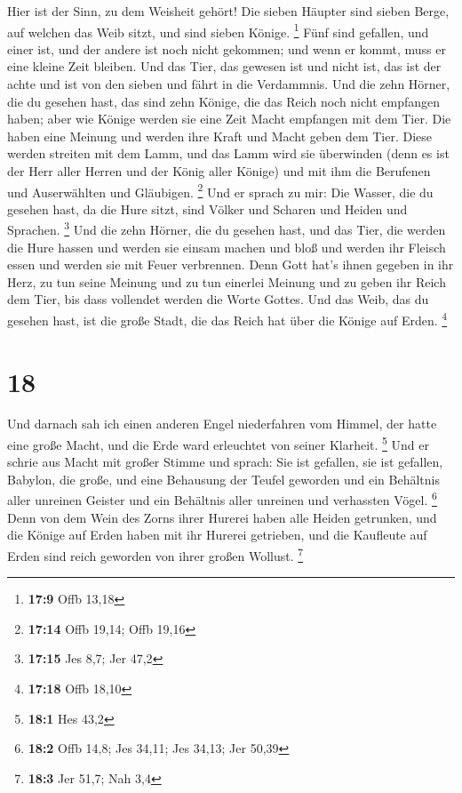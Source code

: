  Hier ist der Sinn, zu dem Weisheit gehört! Die sieben
Häupter sind sieben Berge, auf welchen das Weib sitzt, und sind sieben
Könige. \footnote{\textbf{17:9} Offb 13,18}  Fünf sind
gefallen, und einer ist, und der andere ist noch nicht gekommen; und
wenn er kommt, muss er eine kleine Zeit bleiben.  Und das
Tier, das gewesen ist und nicht ist, das ist der achte und ist von den
sieben und fährt in die Verdammnis.  Und die zehn Hörner,
die du gesehen hast, das sind zehn Könige, die das Reich noch nicht
empfangen haben; aber wie Könige werden sie eine Zeit Macht empfangen
mit dem Tier.  Die haben eine Meinung und werden ihre Kraft
und Macht geben dem Tier.  Diese werden streiten mit dem
Lamm, und das Lamm wird sie überwinden (denn es ist der Herr aller
Herren und der König aller Könige) und mit ihm die Berufenen und
Auserwählten und Gläubigen. \footnote{\textbf{17:14} Offb 19,14; Offb
  19,16}  Und er sprach zu mir: Die Wasser, die du gesehen
hast, da die Hure sitzt, sind Völker und Scharen und Heiden und
Sprachen. \footnote{\textbf{17:15} Jes 8,7; Jer 47,2}  Und
die zehn Hörner, die du gesehen hast, und das Tier, die werden die Hure
hassen und werden sie einsam machen und bloß und werden ihr Fleisch
essen und werden sie mit Feuer verbrennen.  Denn Gott hat's
ihnen gegeben in ihr Herz, zu tun seine Meinung und zu tun einerlei
Meinung und zu geben ihr Reich dem Tier, bis dass vollendet werden die
Worte Gottes.  Und das Weib, das du gesehen hast, ist die
große Stadt, die das Reich hat über die Könige auf Erden. \footnote{\textbf{17:18}
  Offb 18,10}

\hypertarget{section-7}{%
\section{18}\label{section-7}}

 Und darnach sah ich einen anderen Engel niederfahren vom
Himmel, der hatte eine große Macht, und die Erde ward erleuchtet von
seiner Klarheit. \footnote{\textbf{18:1} Hes 43,2}  Und er
schrie aus Macht mit großer Stimme und sprach: Sie ist gefallen, sie ist
gefallen, Babylon, die große, und eine Behausung der Teufel geworden und
ein Behältnis aller unreinen Geister und ein Behältnis aller unreinen
und verhassten Vögel. \footnote{\textbf{18:2} Offb 14,8; Jes 34,11; Jes
  34,13; Jer 50,39}  Denn von dem Wein des Zorns ihrer
Hurerei haben alle Heiden getrunken, und die Könige auf Erden haben mit
ihr Hurerei getrieben, und die Kaufleute auf Erden sind reich geworden
von ihrer großen Wollust. \footnote{\textbf{18:3} Jer 51,7; Nah 3,4}

